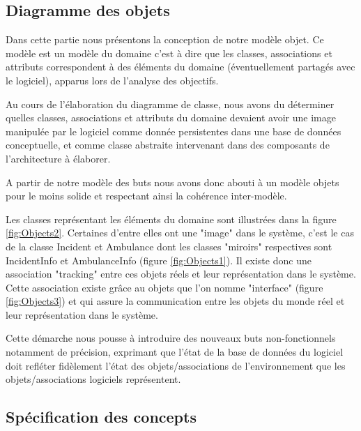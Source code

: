 \subsection{Diagramme des objets}

	Dans cette partie nous présentons la conception de notre modèle objet. Ce
	modèle est un modèle du domaine c'est à dire que les classes, associations
	et attributs correspondent à des éléments du domaine (éventuellement
	partagés avec le logiciel), apparus lors de l'analyse des objectifs. 

	Au cours de l'élaboration du diagramme de classe, nous avons du déterminer
	quelles classes, associations et attributs du domaine devaient avoir une
	image manipulée par le logiciel comme donnée persistentes dans une base de
	données conceptuelle, et comme classe abstraite intervenant dans des
	composants de l'architecture à élaborer. 

	A partir de notre modèle des buts nous avons donc abouti à un modèle objets
	pour le moins solide et respectant ainsi la cohérence inter-modèle. 

	Les classes représentant les éléments du domaine sont illustrées dans la
	figure \ref{fig:Objects2}. Certaines d'entre elles ont une "image" dans le système, c'est
	le cas de la classe Incident et Ambulance dont les classes "miroirs"
	respectives sont IncidentInfo et AmbulanceInfo (figure  \ref{fig:Objects1}). Il existe donc
	une association "tracking" entre ces objets réels et leur représentation
	dans le système. Cette association existe grâce au objets que l'on nomme
	"interface" (figure  \ref{fig:Objects3}) et qui assure la communication entre les objets du
	monde réel et leur représentation dans le système. 

	Cette démarche nous pousse à introduire des nouveaux buts non-fonctionnels
	notamment de précision, exprimant que l'état de la base de données du
	logiciel doit refléter fidèlement l'état des objets/associations de
	l'environnement que les objets/associations logiciels représentent. 


\subsection{Spécification des concepts}
